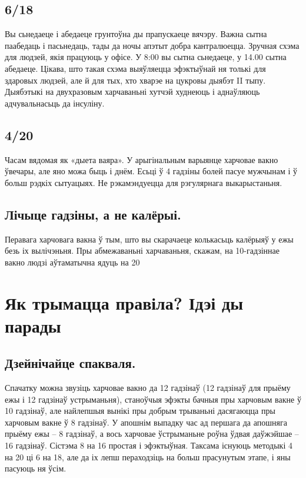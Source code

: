 \subsection{6/18}
Вы сьнедаеце і абедаеце грунтоўна ды прапускаеце вячэру. Важна сытна паабедаць і пасьнедаць, тады да ночы апэтыт добра кантралюецца. Зручная схэма для людзей, якія працуюць у офісе. У 8:00 вы сытна сьнедаеце, у 14.00 сытна абедаеце. Цікава, што такая схэма выяўляецца эфэктыўнай ня толькі для здаровых людзей, але й для тых, хто хварэе на цукровы дыябэт II тыпу. Дыябэтыкі на двухразовым харчаваньні хутчэй худнеюць і аднаўляюць адчувальнасьць да інсуліну.

\subsection{4/20}
Часам вядомая як «дыета ваяра». У арыгінальным варыянце харчовае вакно ўвечары, але яно можа быць і днём. Есьці ў 4 гадзіны болей пасуе мужчынам і ў больш рэдкіх сытуацыях. Не рэкамэндуецца для рэгулярнага выкарыстаньня.

\subsection{Лічыце гадзіны, а не калёрыі.}
Перавага харчовага вакна ў тым, што вы скарачаеце колькасьць калёрыяў у ежы безь іх вылічэньня. Пры абмежаваньні харчаваньня, скажам, на 10-гадзіннае вакно людзі аўтаматычна ядуць на 20%

\section{Як трымацца правіла? Ідэі ды парады}

\subsection{Дзейнічайце спакваля.}
Спачатку можна звузіць харчовае вакно да 12 гадзінаў (12 гадзінаў для прыёму ежы і 12 гадзінаў устрыманьня), станоўчыя эфэкты бачныя пры харчовым вакне ў 10 гадзінаў, але найлепшыя вынікі пры добрым трываньні дасягаюцца пры харчовым вакне ў 8 гадзінаў. У апошнім выпадку час ад першага да апошняга прыёму ежы – 8 гадзінаў, а вось харчовае ўстрыманьне роўна ўдвая даўжэйшае – 16 гадзінаў. Сістэма 8 на 16 простая і эфэктыўная. Таксама існуюць методыкі 4 на 20 ці 6 на 18, але да іх лепш пераходзіць на больш прасунутым этапе, і яны пасуюць ня ўсім.


